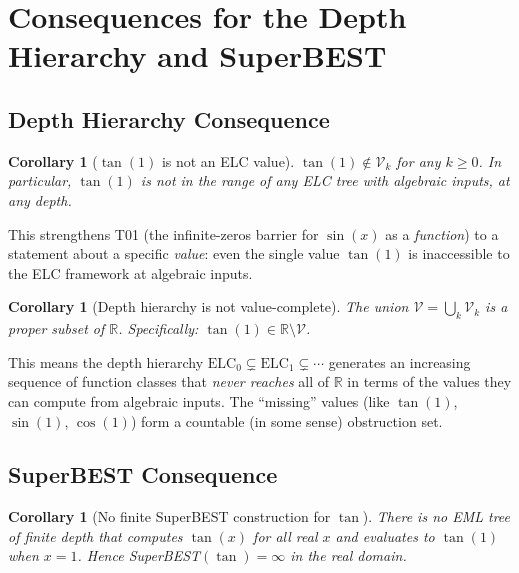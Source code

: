 \documentclass[11pt]{article}
\newtheorem{corollary}[theorem]{Corollary}
\begin{document}
\section{Consequences for the Depth Hierarchy and SuperBEST}
\label{sec:consequences}

\subsection{Depth Hierarchy Consequence}

\begin{corollary}[$\tan(1)$ is not an ELC value]
$\tan(1) \notin \mathcal{V}_k$ for any $k \geq 0$.
In particular, $\tan(1)$ is not in the \emph{range} of any ELC tree with algebraic inputs,
at any depth.
\end{corollary}

This strengthens T01 (the infinite-zeros barrier for $\sin(x)$ as a \emph{function})
to a statement about a specific \emph{value}: even the single value $\tan(1)$
is inaccessible to the ELC framework at algebraic inputs.

\begin{corollary}[Depth hierarchy is not value-complete]
The union $\mathcal{V} = \bigcup_k \mathcal{V}_k$ is a proper subset of $\mathbb{R}$.
Specifically: $\tan(1) \in \mathbb{R} \setminus \mathcal{V}$.
\end{corollary}

\noindent This means the depth hierarchy $\mathrm{ELC}_0 \subsetneq \mathrm{ELC}_1 \subsetneq \cdots$
generates an increasing sequence of function classes that \emph{never reaches} all of $\mathbb{R}$
in terms of the values they can compute from algebraic inputs.
The ``missing'' values (like $\tan(1)$, $\sin(1)$, $\cos(1)$) form a countable
(in some sense) obstruction set.

\subsection{SuperBEST Consequence}

\begin{corollary}[No finite SuperBEST construction for $\tan$]
There is no EML tree of finite depth that computes $\tan(x)$ for all real $x$
and evaluates to $\tan(1)$ when $x = 1$.
Hence SuperBEST$(\tan) = \infty$ in the real domain.
\end{corollary}
\end{document}

